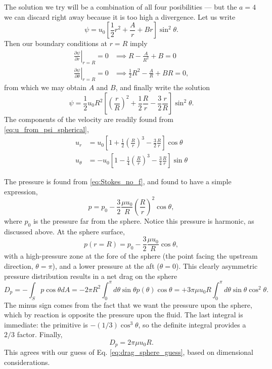 The solution we try will be a combination of all four posibilities --- but
the $a=4$ we can discard right away because it is too high a divergence. Let
us write
\[
  \psi = u_0 \left[ \frac12 r^2 + \frac{A}{r} + B r \right] \sin^2\theta .
\]
Then our boundary conditions at $r=R$ imply
\begin{align*}
  \left.\frac{\partial \psi}{\partial r}\right|_{r=R} = 0 &\implies
                                                            R-\frac{A}{R^2} + B  =0 \\
  \left.\frac{\partial \psi}{\partial \theta}\right|_{r=R} = 0 &\implies
                                                            \frac12 R^2-\frac{A}{R} + BR  =0 ,
\end{align*}
from which we may obtain $A$ and $B$, and finally write the solution
\[
  \psi = \frac12 u_0 R^2
  \left[\left(  \frac{r}{R} \right)^2
    + \frac12 \frac{R}{r} - \frac32 \frac{r}{R} \right] \sin^2\theta .
\]
The components of the velocity are readily found from
\ref{eq:u_from_psi_spherical},
\begin{equation*}
  \begin{split}
    u_r     &=  u_0  \left[
      1+ \frac12 \left(\frac{R}{r}\right)^3 - \frac32 \frac{R}{r}
    \right] \cos \theta \\
    u_\theta &=
    - u_0  \left[
      1
      - \frac14 \left(\frac{R}{r}\right)^3 - \frac34 \frac{R}{r}
    \right] \sin \theta
  \end{split}
\end{equation*}

The pressure is found from \ref{eq:Stokes_no_f}, and found to have a
simple expression,
\[
  p=p_0 - \frac32 \frac{\mu u_0}{R} \left(\frac{R}{r}\right)^2
  \cos\theta ,
\]
where $p_0$ is the pressure far from the sphere. Notice this pressure
is harmonic, as discussed above. At the sphere surface,
\[
  p(r=R) = p_0 - \frac32 \frac{\mu u_0}{R} \cos\theta,
\]
with a high-pressure zone at the fore of the sphere (the point facing
the upstream direction, $\theta=\pi$), and a lower pressure at the aft
($\theta=0$). This clearly asymmetric pressure distribution results in
a net drag on the sphere
\[
  D_p=  - \int_S  p \cos\theta dA =
  -2\pi R^2 \int_0^\pi d\theta \sin\theta  p(\theta) \cos\theta =
  + 3 \pi \mu u_0 R \int_0^\pi d\theta \sin\theta  \cos^2\theta .
\]
The minus sign comes from the fact that we want the pressure upon the
sphere, which by reaction is opposite the pressure upon the fluid.
The last integral is immediate: the primitive is $-(1/3)\cos^3\theta$,
so the definite integral provides a $2/3$ factor. Finally,
\[
  D_p=  2 \pi \mu u_0 R .
\]
This agrees with our guess of Eq. \ref{eq:drag_sphere_guess}, based on
dimensional considerations.

